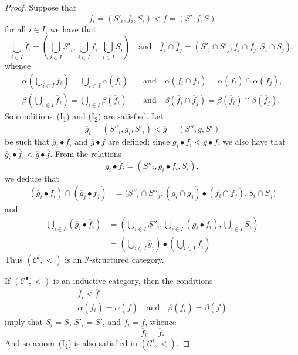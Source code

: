 \documentclass[a4paper,fleqn]{article}
\theoremstyle{plain}
\theoremstyle{definition}
\newcommand{\oldpage}[1]{{\marginpar{\footnotesize$\bigg\vert$\,\,\,\,\textit{p.~#1}}}}
\newcommand{\textand}{\quad\text{and}\quad}
\newcommand{\CC}{\mathcal{C}}
\newcommand{\II}{\mathcal{I}}
\begin{document}
\begin{proof}
  \oldpage{408}
  Suppose that
  \[
    \overline{f}_i
    = (S'_i,f_i,S_i)
    < \overline{f}
    = (S',f,S)
  \]
  for all $i\in I$;
  we have that
  \[
    \bigcup_{i\in I}\overline{f}_i
    = \left(\bigcup_{i\in I}S'_i, \bigcup_{i\in I}f_i, \bigcup_{i\in I}S_i\right)
    \textand
    \bar{f}_i\cap\bar{f}_j
    = (S'_i\cap S'_j, f_i\cap f_j, S_i\cap S_j),
  \]
  whence
  \[
    \begin{aligned}
      \alpha\left(\bigcup_{i\in I}\overline{f}_i\right)
      = \bigcup_{i\in I}\alpha(\overline{f}_i)
      &\textand
      \alpha(\overline{f}_i\cap\overline{f}_j)
      = \alpha(\overline{f}_i)\cap\alpha(\overline{f}_j),
    \\\beta\left(\bigcup_{i\in I}\overline{f}_i\right)
      = \bigcup_{i\in I}\beta(\overline{f}_i)
      &\textand
      \beta(\overline{f}_i\cap\overline{f}_j)
      = \beta(\overline{f}_i)\cap\beta(\overline{f}_j).
    \end{aligned}
  \]
  So conditions~(I\textsubscript{1}) and (I\textsubscript{2}) are satisfied.
  Let
  \[
    \overline{g}_i
    = (S''_i,g_i,S'_i)
    < \overline{g}
    = (S'',g,S')
  \]
  be such that $\overline{g}_i\bullet\overline{f}_i$ and $\overline{g}\bullet\overline{f}$ are defined;
  since $g_i\bullet f_i<g\bullet f$, we also have that $\overline{g}_i\bullet\overline{f}_i<\overline{g}\bullet\overline{f}$.
  From the relations
  \[
    \overline{g}_i\bullet\overline{f}_i
    = (S''_i,g_i\bullet f_i,S_i),
  \]
  we deduce that
  \[
    \begin{aligned}
      (\overline{g}_i\bullet\overline{f}_i)\cap(\overline{g}_j\bullet\overline{f}_j)
      &= \big(
        S''_i\cap S''_j,
        (g_i\cap g_j)\bullet(f_i\cap f_j),
        S_i\cap S_j
      \big)
    \end{aligned}
  \]
  and
  \[
    \begin{aligned}
      \bigcup_{i\in I}(\overline{g}_i\bullet\overline{f}_i)
      &= \left(
        \bigcup_{i\in I}S''_i,
        \bigcup_{i\in I}(g_i\bullet f_i),
        \bigcup_{i\in I}S_i
      \right)
    \\&= \left(\bigcup_{i\in I}\overline{g}_i\right)\bullet\left(\bigcup_{i\in I}\overline{f}_i\right).
    \end{aligned}
  \]
  Thus $(\CC^l,<)$ is an $\II$-structured category.

  If $(\CC^\bullet,<)$ is an inductive category, then the conditions
  \[
    \begin{gathered}
      \overline{f}_i<\overline{f}
    \\\alpha(\overline{f}_i)=\alpha(\overline{f})
      \textand
      \beta(\overline{f}_i)=\beta(\overline{f})
    \end{gathered}
  \]
  imply that $S_i=S$, $S'_i=S'$, and $f_i=f$, whence
  \[
    \overline{f}_i
    = \overline{f}.
  \]
  And so axiom~(I\textquotesingle\!\textsubscript{4}) is also satisfied in $(\CC^l,<)$.


\end{proof}
\end{document}
